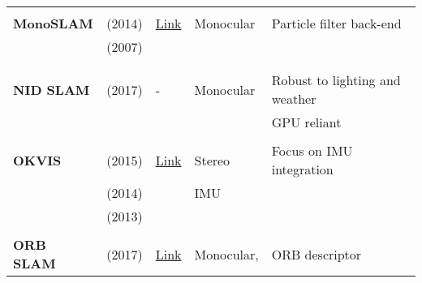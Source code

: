 \documentclass[a4paper,12pt]{scrartcl}
\begin{document}
{\begin{longtable}{l|l|l|l|l}
                           &                                   &                                                                    &                       &\\
    \textbf{MonoSLAM}      & \cite{Russo2014} (2014)           & {\href{https://github.com/rrg-polito/mono-slam}{Link}}             & Monocular             & Particle filter back-end\\
                           & \cite{Davison2007} (2007)         &                                                                    &                       &\\
                           &                                   &                                                                    &                       &\\
                           &                                   &                                                                    &                       &\\
    \textbf{NID SLAM}      & \cite{Pascoe2017} (2017)          & -                                                                  & Monocular             & Robust to lighting and weather\\
                           &                                   &                                                                    &                       & GPU reliant\\
                           &                                   &                                                                    &                       &\\
    \textbf{OKVIS}         & \cite{Leutenegger2015} (2015)     & {\href{https://github.com/ethz-asl/okvis_ros}{Link}}               & Stereo                & Focus on IMU integration\\
                           & \cite{Leutenegger2014} (2014)     &                                                                    & IMU                   &\\
                           & \cite{Leutenegger2013} (2013)     &                                                                    &                       &\\
                           &                                   &                                                                    &                       &\\
    \textbf{ORB SLAM}      & \cite{Mur-Artal2017} (2017)       & \href{https://github.com/raulmur/ORB_SLAM2}{Link}                  &  Monocular,           & ORB descriptor\\

\end{longtable}}
\end{document}
